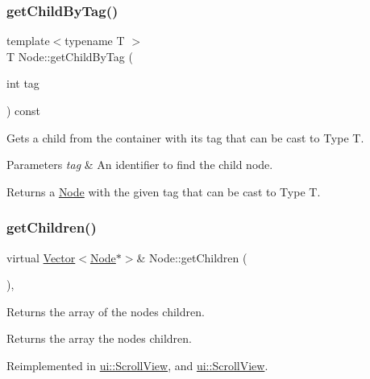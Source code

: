 \subsubsection{\texorpdfstring{get\+Child\+By\+Tag()}{getChildByTag()}\hspace{0.1cm}{\footnotesize\ttfamily [4/4]}}
{\footnotesize\ttfamily template$<$typename T $>$ \\
T Node\+::get\+Child\+By\+Tag (\begin{DoxyParamCaption}\item[{int}]{tag }\end{DoxyParamCaption}) const\hspace{0.3cm}{\ttfamily [inline]}}

Gets a child from the container with its tag that can be cast to Type T.


\begin{DoxyParams}{Parameters}
{\em tag} & An identifier to find the child node.\\
\hline
\end{DoxyParams}
\begin{DoxyReturn}{Returns}
a \hyperlink{classNode}{Node} with the given tag that can be cast to Type T. 
\end{DoxyReturn}
\mbox{\label{classNode_a25943a94b19e37929b18f93647b58153}} 
\subsubsection{\texorpdfstring{get\+Children()}{getChildren()}\hspace{0.1cm}{\footnotesize\ttfamily [1/2]}}
{\footnotesize\ttfamily virtual \hyperlink{classVector}{Vector}$<$\hyperlink{classNode}{Node}$\ast$$>$\& Node\+::get\+Children (\begin{DoxyParamCaption}{ }\end{DoxyParamCaption})\hspace{0.3cm}{\ttfamily [inline]}, {\ttfamily [virtual]}}

Returns the array of the node\textquotesingle{}s children.

\begin{DoxyReturn}{Returns}
the array the node\textquotesingle{}s children. 
\end{DoxyReturn}


Reimplemented in \hyperlink{classui_1_1ScrollView_adf13c7fc4c49dc4030dd4482f7de62b7}{ui\+::\+Scroll\+View}, and \hyperlink{classui_1_1ScrollView_abde6bf60f60db8d75ac5a63aa0f47dbc}{ui\+::\+Scroll\+View}.

